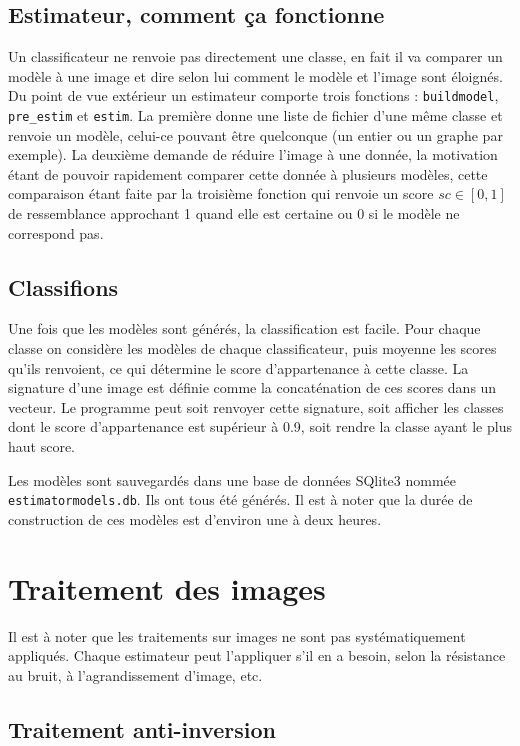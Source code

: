 \documentclass{article}
\theoremstyle{definition}
\begin{document}
  	   \subsection{Estimateur, comment ça fonctionne}
	Un classificateur ne renvoie pas directement une classe, en fait il va comparer un modèle à une image et dire selon lui comment le modèle et l'image sont éloignés. Du point de vue extérieur un estimateur comporte trois fonctions : \verb-buildmodel-, \verb-pre_estim- et \verb-estim-. La première donne une liste de fichier d'une même classe et renvoie un modèle, celui-ce pouvant être quelconque (un entier ou un graphe par exemple). La deuxième demande de réduire l'image à une donnée, la motivation étant de pouvoir rapidement comparer cette donnée à plusieurs modèles, cette comparaison étant faite par la troisième fonction qui renvoie un score $sc \in [0,1]$ de ressemblance approchant 1 quand elle est certaine ou 0 si le modèle ne correspond pas.

  	   \subsection{Classifions}
  	   Une fois que les modèles sont générés, la classification est facile. Pour chaque classe on considère les modèles de chaque classificateur, puis moyenne les scores qu'ils renvoient, ce qui détermine le score d'appartenance à cette classe. La signature d'une image est définie comme la concaténation de ces scores dans un vecteur. Le programme peut soit renvoyer cette signature, soit afficher les classes dont le score d'appartenance est supérieur à 0.9, soit rendre la classe ayant le plus haut score.
  	   
  	    Les modèles sont sauvegardés dans une base de données SQlite3 nommée \verb-estimatormodels.db-. Ils ont tous été générés. Il est à noter que la durée de construction de ces modèles est d'environ une à deux heures.
  
  \section{Traitement des images}
  
  	Il est à noter que les traitements sur images ne sont pas systématiquement appliqués. Chaque estimateur peut l'appliquer s'il en a besoin, selon la résistance au bruit, à l'agrandissement d'image, etc.
  
    \subsection{Traitement anti-inversion}
    \label{sec:anti-inversion}
    
\end{document}
